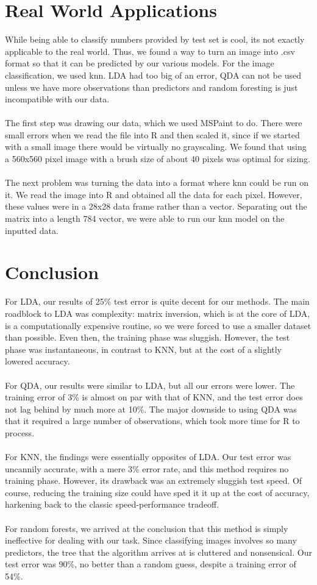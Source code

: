 \documentclass[10pt]{extarticle}
\begin{document}
\section{Real World Applications}

While being able to classify numbers provided by test set is cool, its not exactly applicable to the real world. Thus, we found a way to turn an image into .csv format so that it can be predicted by our various models. For the image classification, we used knn. LDA had too big of an error, QDA can not be used unless we have more observations than predictors and random foresting is just incompatible with our data.\\\\
The first step was drawing our data, which we used MSPaint to do. There were small errors when we read the file into R and then scaled it, since if we started with a small image there would be virtually no grayscaling. We found that using a 560x560 pixel image with a brush size of about 40 pixels was optimal for sizing.\\\\
The next problem was turning the data into a format where knn could be run on it. We read the image into R and obtained all the data for each pixel. However, these values were in a 28x28 data frame rather than a vector. Separating out the matrix into a length 784 vector, we were able to run our knn model on the inputted data.

\section{Conclusion}
For LDA, our results of 25\% test error is quite decent for our methods. The main roadblock to LDA was complexity: matrix inversion, which is at the core of LDA, is a computationally expensive routine, so we were forced to use a smaller dataset than possible. Even then, the training phase was sluggish. However, the test phase was instantaneous, in contrast to KNN, but at the cost of a slightly lowered accuracy. \\\\
For QDA, our results were similar to LDA, but all our errors were lower. The training error of 3\% is almost on par with that of KNN, and the test error does not lag behind by much more at 10\%. The major downside to using QDA was that it required a large number of observations, which took more time for R to process.\\\\
For KNN, the findings were essentially opposites of LDA. Our test error was uncannily accurate, with a mere 3\% error rate, and this method requires no training phase. However, its drawback was an extremely sluggish test speed. Of course, reducing the training size could have sped it it up at the cost of accuracy, harkening back to the classic speed-performance tradeoff. \\\\
For random forests, we arrived at the conclusion that this method is simply ineffective for dealing with our task. Since classifying images involves so many predictors, the tree that the algorithm arrives at is cluttered and nonsensical. Our test error was 90\%, no better than a random guess, despite a training error of 54\%. 
\end{document}
